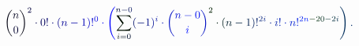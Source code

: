 \documentclass[12pt]{article}
\begin{document}
\makeatletter
\renewcommand*{\@textcolor}[3]{%
  \protect\leavevmode
  \begingroup
    \color#1{#2}#3%
  \endgroup
}
\makeatother
\begin{displaymath}
\mathcolor[RGB]{0,0,15}{\binom { \mathcolor[RGB]{0,0,30}{n} } { \mathcolor[RGB]{0,0,45}{0} } } ^ { \mathcolor[RGB]{0,0,60}{2} } \mathcolor[RGB]{0,0,75}{\cdot} \mathcolor[RGB]{0,0,90}{0} \mathcolor[RGB]{0,0,105}{!} \mathcolor[RGB]{0,0,120}{\cdot} \mathcolor[RGB]{0,0,135}{(} \mathcolor[RGB]{0,0,150}{n} \mathcolor[RGB]{0,0,165}{-} \mathcolor[RGB]{0,0,180}{1} \mathcolor[RGB]{0,0,195}{)} \mathcolor[RGB]{0,0,210}{!} ^ { \mathcolor[RGB]{0,0,225}{0} } \mathcolor[RGB]{0,0,240}{\cdot} \mathcolor[RGB]{0,0,255}{\left(} \mathcolor[RGB]{0,15,0}{\sum} _ { \mathcolor[RGB]{0,15,15}{i} \mathcolor[RGB]{0,15,30}{=} \mathcolor[RGB]{0,15,45}{0} } ^ { \mathcolor[RGB]{0,15,60}{n} \mathcolor[RGB]{0,15,75}{-} \mathcolor[RGB]{0,15,90}{0} } \mathcolor[RGB]{0,15,105}{(} \mathcolor[RGB]{0,15,120}{-} \mathcolor[RGB]{0,15,135}{1} \mathcolor[RGB]{0,15,150}{)} ^ { \mathcolor[RGB]{0,15,165}{i} } \mathcolor[RGB]{0,15,180}{\cdot} \mathcolor[RGB]{0,15,195}{\binom { \mathcolor[RGB]{0,15,210}{n} \mathcolor[RGB]{0,15,225}{-} \mathcolor[RGB]{0,15,240}{0} } { \mathcolor[RGB]{0,15,255}{i} } } ^ { \mathcolor[RGB]{0,30,0}{2} } \mathcolor[RGB]{0,30,15}{\cdot} \mathcolor[RGB]{0,30,30}{(} \mathcolor[RGB]{0,30,45}{n} \mathcolor[RGB]{0,30,60}{-} \mathcolor[RGB]{0,30,75}{1} \mathcolor[RGB]{0,30,90}{)} \mathcolor[RGB]{0,30,105}{!} ^ { \mathcolor[RGB]{0,30,120}{2} \mathcolor[RGB]{0,30,135}{i} } \mathcolor[RGB]{0,30,150}{\cdot} \mathcolor[RGB]{0,30,165}{i} \mathcolor[RGB]{0,30,180}{!} \mathcolor[RGB]{0,30,195}{\cdot} \mathcolor[RGB]{0,30,210}{n} \mathcolor[RGB]{0,30,225}{!} ^ { \mathcolor[RGB]{0,30,240}{2} \mathcolor[RGB]{0,30,255}{n} \mathcolor[RGB]{0,45,0}{-} \mathcolor[RGB]{0,45,15}{2} \mathcolor[RGB]{0,45,30}{0} \mathcolor[RGB]{0,45,45}{-} \mathcolor[RGB]{0,45,60}{2} \mathcolor[RGB]{0,45,75}{i} } \mathcolor[RGB]{0,45,90}{\right)} \mathcolor[RGB]{0,45,105}{.}
\end{displaymath}
\end{document}
